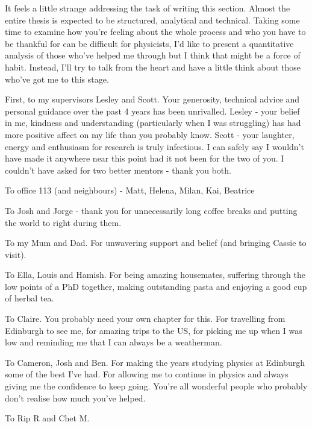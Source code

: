 \begin{acknowledgements}

It feels a little strange addressing the task of writing this section. Almost the entire thesis is expected to be structured, analytical and technical. Taking some time to examine how you're feeling about the whole process and who you have to be thankful for can be difficult for physicists, I'd like to present a quantitative analysis of those who've helped me through but I think that might be a force of habit. Instead, I'll try to talk from the heart and have a little think about those who've got me to this stage.

First, to my supervisors Lesley and Scott. Your generosity, technical advice and personal guidance over the past 4 years has been unrivalled. Lesley - your belief in me, kindness and understanding (particularly when I was struggling) has had more positive affect on my life than you probably know. Scott - your laughter, energy and enthusiasm for research is truly infectious. I can safely say I wouldn't have made it anywhere near this point had it not been for the two of you. I couldn't have asked for two better mentors - thank you both.

To office 113 (and neighbours) - Matt, Helena, Milan, Kai, Beatrice  

To Josh and Jorge - thank you for unnecessarily long coffee breaks and putting the world to right during them.

To my Mum and Dad. For unwavering support and belief (and bringing Cassie to visit).

To Ella, Louis and Hamish. For being amazing housemates, suffering through the low points of a PhD together, making outstanding pasta and enjoying a good cup of herbal tea. 

To Claire. You probably need your own chapter for this. For travelling from Edinburgh to see me, for amazing trips to the US, for picking me up when I was low and reminding me that I can always be a weatherman. 

To Cameron, Josh and Ben. For making the years studying physics at Edinburgh some of the best I've had. For allowing me to continue in physics and always giving me the confidence to keep going. You're all wonderful people who probably don't realise how much you've helped.

To Rip R and Chet M. 


\end{acknowledgements}




